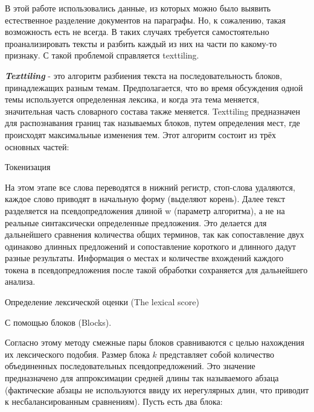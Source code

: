 \documentclass[12pt]{article}
\newcounter{c_tab}
\begin{document}
В этой работе использовались данные, из которых можно было выявить естественное разделение документов на параграфы. Но, к сожалению, такая возможность есть не всегда. В таких случаях требуется самостоятельно проанализировать тексты и разбить каждый из них на части по какому-то признаку. С такой проблемой справляется texttiling.

\textbf{\textit{Texttiling}} - это алгоритм разбиения текста на последовательность блоков, принадлежащих разным темам. Предполагается, что во время обсуждения одной темы используется определенная лексика, и когда эта тема меняется, значительная часть словарного состава также меняется. Texttiling предназначен для распознавания границ так называемых блоков, путем определения мест, где происходят максимальные изменения тем.
Этот алгоритм состоит из трёх основных частей:
\par\begin{enumerate}{
		\vspace{0.2cm}\item Токенизация
		
		На этом этапе все слова переводятся в нижний регистр, стоп-слова удаляются, каждое слово приводят в начальную форму (выделяют корень). Далее текст разделяется на псевдопредложения длиной w (параметр алгоритма), а не на реальные синтаксически определенные предложения. Это делается для дальнейшего сравнения количества общих терминов, так как сопоставление двух одинаково длинных предложений и сопоставление короткого и длинного дадут разные результаты. Информация о местах и количестве вхождений каждого токена в псевдопредложения после такой обработки сохраняется для дальнейшего анализа.
		
		\vspace{0.2cm}\item Определение лексической оценки (The lexical score)
		
		\par\begin{itemize}{
				\item С помощью блоков (Blocks).
				
				Согласно этому методу смежные пары блоков сравниваются с целью нахождения их лексического подобия. Размер блока $k$ представляет собой количество объединенных последовательных псевдопредложений. Это значение предназначено для аппроксимации средней длины так называемого абзаца (фактические абзацы не используются ввиду их нерегулярных длин, что приводит к несбалансированным сравнениям). Пусть есть два блока:
				
}
\end{itemize}}
\end{enumerate}
\end{document}
